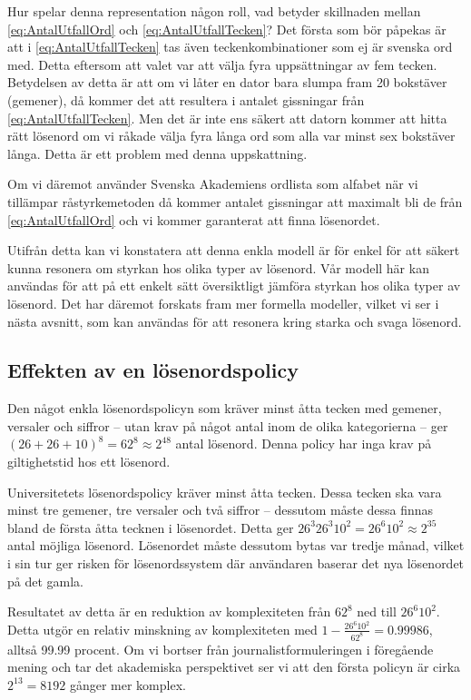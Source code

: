 Hur spelar denna representation någon roll, vad betyder skillnaden mellan
\cref{eq:AntalUtfallOrd} och \cref{eq:AntalUtfallTecken}?
Det första som bör påpekas är att i \cref{eq:AntalUtfallTecken} tas även
teckenkombinationer som ej är svenska ord med.
Detta eftersom att valet var att välja fyra uppsättningar av fem tecken.
Betydelsen av detta är att om vi låter en dator bara slumpa fram 20 bokstäver
(gemener), då kommer det att resultera i antalet gissningar från
\cref{eq:AntalUtfallTecken}.
Men det är inte ens säkert att datorn kommer att hitta rätt lösenord om vi 
råkade välja fyra långa ord som alla var minst sex bokstäver långa.
Detta är ett problem med denna uppskattning.

Om vi däremot använder Svenska Akademiens ordlista som alfabet när vi tillämpar 
råstyrkemetoden då kommer antalet gissningar att maximalt bli de från
\cref{eq:AntalUtfallOrd} och vi kommer garanterat att finna lösenordet.

Utifrån detta kan vi konstatera att denna enkla modell är för enkel för att 
säkert kunna resonera om styrkan hos olika typer av lösenord.
Vår modell här kan användas för att på ett enkelt sätt översiktligt jämföra 
styrkan hos olika typer av lösenord.
Det har däremot forskats fram mer formella modeller, vilket vi ser i nästa 
avsnitt, som kan användas för att resonera kring starka och svaga lösenord.

\subsection{Effekten av en lösenordspolicy}
Den något enkla lösenordspolicyn som kräver minst åtta tecken med gemener, 
versaler och siffror -- utan krav på något antal inom de olika kategorierna -- 
ger \( (26 + 26 + 10)^8 = 62^8 \approx 2^{48} \) antal lösenord.
Denna policy har inga krav på giltighetstid hos ett lösenord.

Universitetets lösenordspolicy kräver minst åtta tecken.
Dessa tecken ska vara minst tre gemener, tre versaler och två siffror -- 
dessutom måste dessa finnas bland de första åtta tecknen i lösenordet.
Detta ger \( 26^3 26^3 10^2 = 26^6 10^2 \approx 2^{35} \) antal möjliga 
lösenord.
Lösenordet måste dessutom bytas var tredje månad, vilket i sin tur ger risken 
för lösenordssystem där användaren baserar det nya lösenordet på det gamla.

Resultatet av detta är en reduktion av komplexiteten från \( 62^8 \) ned till 
\( 26^6 10^2 \).
Detta utgör en relativ minskning av komplexiteten med \( 1-\frac{26^6 
10^2}{62^8} = 0.99986 \), alltså 99.99 procent.
Om vi bortser från journalistformuleringen i föregående mening och tar det 
akademiska perspektivet ser vi att den första policyn är cirka \( 2^{13} = 8192 
\) gånger mer komplex.

